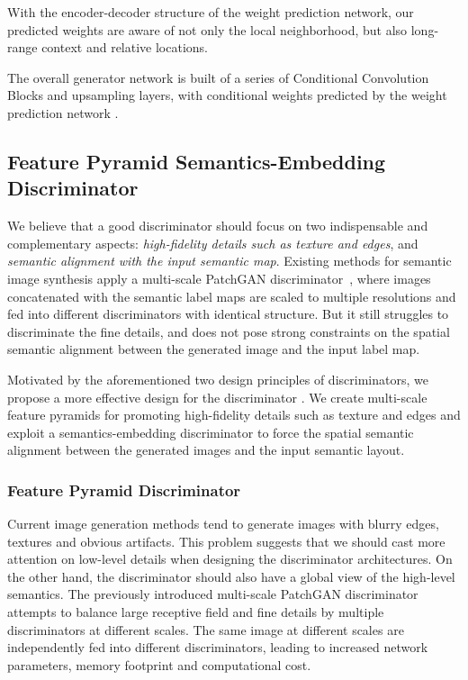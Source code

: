 \documentclass{article}
\begin{document}
With the encoder-decoder structure of the weight prediction network, our predicted weights are aware of not only the local neighborhood, but also long-range context and relative locations.


The overall generator network  is built of a series of Conditional Convolution Blocks and upsampling layers, with conditional weights predicted by the weight prediction network .
\subsection{Feature Pyramid Semantics-Embedding Discriminator}

We believe that a good discriminator should focus on two indispensable and complementary aspects: \textit{high-fidelity details such as texture and edges}, and \textit{semantic alignment with the input semantic map}.
Existing methods for semantic image synthesis apply a multi-scale PatchGAN discriminator~\cite{wang2018high,park2019semantic}, where images concatenated with the semantic label maps are scaled to multiple resolutions and fed into different discriminators with identical structure.
But it still struggles to discriminate the fine details, and does not pose strong constraints on the spatial semantic alignment between the generated image and the input label map.








Motivated by the aforementioned two design principles of discriminators, we propose a more effective design for the discriminator .
We create multi-scale feature pyramids for promoting high-fidelity details such as texture and edges and exploit a semantics-embedding discriminator to force the spatial semantic alignment between the generated images and the input semantic layout.

\subsubsection{Feature Pyramid Discriminator}
Current image generation methods tend to generate images with blurry edges, textures and obvious artifacts.
This problem suggests that we should cast more attention on low-level details when designing the discriminator architectures.
On the other hand, the discriminator should also have a global view of the high-level semantics.
The previously introduced multi-scale PatchGAN discriminator~\cite{wang2018high} attempts to balance large receptive field and fine details by multiple discriminators at different scales.
The same image at different scales are independently fed into different discriminators, leading to increased network parameters, memory footprint and computational cost. 
\end{document}
